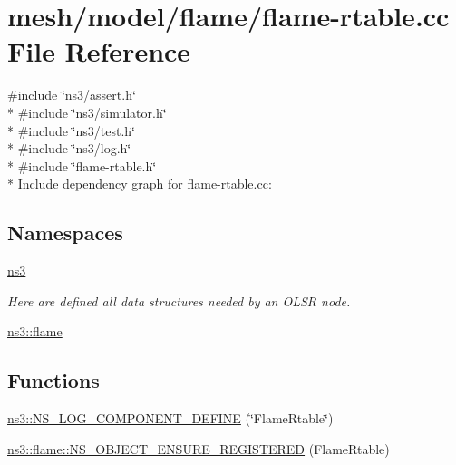 \hypertarget{flame-rtable_8cc}{}\section{mesh/model/flame/flame-\/rtable.cc File Reference}
\label{flame-rtable_8cc}
{\ttfamily \#include \char`\"{}ns3/assert.\+h\char`\"{}}\\*
{\ttfamily \#include \char`\"{}ns3/simulator.\+h\char`\"{}}\\*
{\ttfamily \#include \char`\"{}ns3/test.\+h\char`\"{}}\\*
{\ttfamily \#include \char`\"{}ns3/log.\+h\char`\"{}}\\*
{\ttfamily \#include \char`\"{}flame-\/rtable.\+h\char`\"{}}\\*
Include dependency graph for flame-\/rtable.cc\+:
\subsection*{Namespaces}
\begin{DoxyCompactItemize}
\item 
 \hyperlink{namespacens3}{ns3}
\begin{DoxyCompactList}\small\item\em Here are defined all data structures needed by an O\+L\+SR node. \end{DoxyCompactList}\item 
 \hyperlink{namespacens3_1_1flame}{ns3\+::flame}
\end{DoxyCompactItemize}
\subsection*{Functions}
\begin{DoxyCompactItemize}
\item 
\hyperlink{namespacens3_a51d4f9b56401b962f919873d345401e7}{ns3\+::\+N\+S\+\_\+\+L\+O\+G\+\_\+\+C\+O\+M\+P\+O\+N\+E\+N\+T\+\_\+\+D\+E\+F\+I\+NE} (\char`\"{}Flame\+Rtable\char`\"{})
\item 
\hyperlink{namespacens3_1_1flame_a7fb2707e1cdf8b97cd8a0e9b490e5470}{ns3\+::flame\+::\+N\+S\+\_\+\+O\+B\+J\+E\+C\+T\+\_\+\+E\+N\+S\+U\+R\+E\+\_\+\+R\+E\+G\+I\+S\+T\+E\+R\+ED} (Flame\+Rtable)
\end{DoxyCompactItemize}
